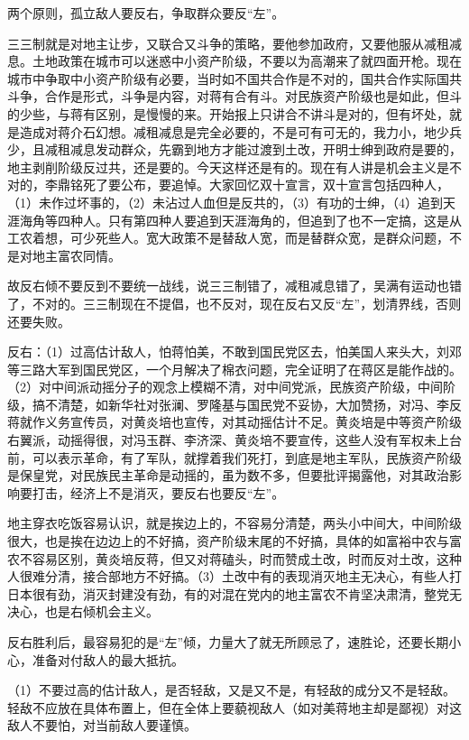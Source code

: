 两个原则，孤立敌人要反右，争取群众要反“左”。

三三制就是对地主让步，又联合又斗争的策略，要他参加政府，又要他服从减租减息。土地政策在城市可以迷惑中小资产阶级，不要以为高潮来了就四面开枪。现在城市中争取中小资产阶级有必要，当时如不国共合作是不对的，国共合作实际国共斗争，合作是形式，斗争是内容，对蒋有合有斗。对民族资产阶级也是如此，但斗的少些，与蒋有区别，是慢慢的来。开始报上只讲合不讲斗是对的，但有坏处，就是造成对蒋介石幻想。减租减息是完全必要的，不是可有可无的，我力小，地少兵少，且减租减息发动群众，先霸到地方才能过渡到土改，开明士绅到政府是要的，地主剥削阶级反过共，还是要的。今天这样还是有的。现在有人讲是机会主义是不对的，李鼎铭死了要公布，要追悼。大家回忆双十宣言，双十宣言包括四种人，（1）未作过坏事的，（2）未沾过人血但是反共的，（3）有功的士绅，（4）追到天涯海角等四种人。只有第四种人要追到天涯海角的，但追到了也不一定搞，这是从工农着想，可少死些人。宽大政策不是替敌人宽，而是替群众宽，是群众问题，不是对地主富农同情。

故反右倾不要反到不要统一战线，说三三制错了，减租减息错了，吴满有运动也错了，不对的。三三制现在不提倡，也不反对，现在反右又反“左”，划清界线，否则还要失败。

反右：（1）过高估计敌人，怕蒋怕美，不敢到国民党区去，怕美国人来头大，刘邓等三路大军到国民党区，一个月解决了棉衣问题，完全证明了在蒋区是能作战的。（2）对中间派动摇分子的观念上模糊不清，对中间党派，民族资产阶级，中间阶级，搞不清楚，如新华社对张澜、罗隆基与国民党不妥协，大加赞扬，对冯、李反蒋就作义务宣传员，对黄炎培也宣传，对其动摇估计不足。黄炎培是中等资产阶级右翼派，动摇得很，对冯玉群、李济深、黄炎培不要宣传，这些人没有军权未上台前，可以表示革命，有了军队，就撑着我们死打，到底是地主军队，民族资产阶级是保皇党，对民族民主革命是动摇的，虽为数不多，但要批评揭露他，对其政治影响要打击，经济上不是消灭，要反右也要反“左”。

地主穿衣吃饭容易认识，就是挨边上的，不容易分清楚，两头小中间大，中间阶级很大，也是挨在边边上的不好搞，资产阶级末尾的不好搞，具体的如富裕中农与富农不容易区别，黄炎培反蒋，但又对蒋磕头，时而赞成土改，时而反对土改，这种人很难分清，接合部地方不好搞。（3）土改中有的表现消灭地主无决心，有些人打日本很有劲，消灭封建没有劲，有的对混在党内的地主富农不肯坚决肃清，整党无决心，也是右倾机会主义。

反右胜利后，最容易犯的是“左”倾，力量大了就无所顾忌了，速胜论，还要长期小心，准备对付敌人的最大抵抗。

（1）不要过高的估计敌人，是否轻敌，又是又不是，有轻敌的成分又不是轻敌。轻敌不应放在具体布置上，但在全体上要藐视敌人（如对美蒋地主却是鄙视）对这敌人不要怕，对当前敌人要谨慎。

